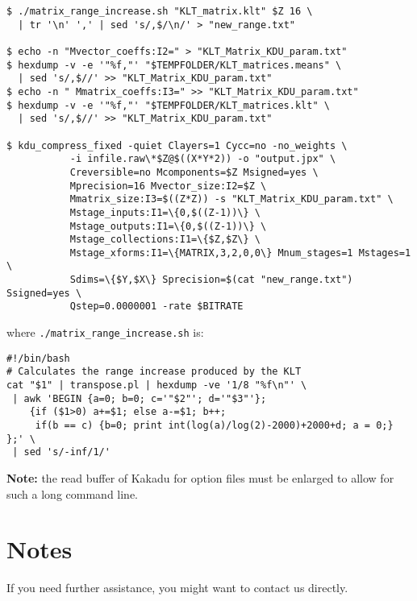 \documentclass[a4paper,10pt]{article}
\begin{document}
\begin{itemize}
\begin{framed}
\begin{verbatim}
$ ./matrix_range_increase.sh "KLT_matrix.klt" $Z 16 \
  | tr '\n' ',' | sed 's/,$/\n/' > "new_range.txt"

$ echo -n "Mvector_coeffs:I2=" > "KLT_Matrix_KDU_param.txt"
$ hexdump -v -e '"%f,"' "$TEMPFOLDER/KLT_matrices.means" \
  | sed 's/,$//' >> "KLT_Matrix_KDU_param.txt"
$ echo -n " Mmatrix_coeffs:I3=" >> "KLT_Matrix_KDU_param.txt"
$ hexdump -v -e '"%f,"' "$TEMPFOLDER/KLT_matrices.klt" \
  | sed 's/,$//' >> "KLT_Matrix_KDU_param.txt"

$ kdu_compress_fixed -quiet Clayers=1 Cycc=no -no_weights \
           -i infile.raw\*$Z@$((X*Y*2)) -o "output.jpx" \
           Creversible=no Mcomponents=$Z Msigned=yes \
           Mprecision=16 Mvector_size:I2=$Z \
           Mmatrix_size:I3=$((Z*Z)) -s "KLT_Matrix_KDU_param.txt" \
           Mstage_inputs:I1=\{0,$((Z-1))\} \
           Mstage_outputs:I1=\{0,$((Z-1))\} \
           Mstage_collections:I1=\{$Z,$Z\} \
           Mstage_xforms:I1=\{MATRIX,3,2,0,0\} Mnum_stages=1 Mstages=1 \
           Sdims=\{$Y,$X\} Sprecision=$(cat "new_range.txt") Ssigned=yes \
           Qstep=0.0000001 -rate $BITRATE
\end{verbatim}%
\vspace{-1em}%
\end{framed}
where \texttt{./matrix\_range\_increase.sh} is:
\begin{framed}%
\vspace{-1em}%
\begin{verbatim}
#!/bin/bash
# Calculates the range increase produced by the KLT
cat "$1" | transpose.pl | hexdump -ve '1/8 "%f\n"' \ 
 | awk 'BEGIN {a=0; b=0; c='"$2"'; d='"$3"'};
    {if ($1>0) a+=$1; else a-=$1; b++;
     if(b == c) {b=0; print int(log(a)/log(2)-2000)+2000+d; a = 0;} };' \
 | sed 's/-inf/1/'
\end{verbatim}%
\vspace{-1em}%
\end{framed}

\textbf{Note:} the read buffer of Kakadu for option files must be enlarged to allow for such a long command line.

\end{itemize}
\section{Notes}

If you need further assistance, you might want to contact us directly.



\end{document}
